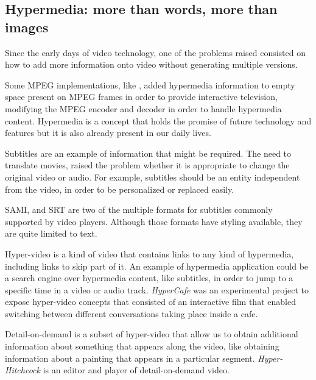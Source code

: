 \subsection{Hypermedia: more than words, more than images}
\label{hypermedia}


Since the early days of video technology, one of the problems raised consisted on how to add more information onto video without generating multiple versions.

Some \ac{MPEG} implementations, like \cite{embedded}, added hypermedia information to empty space present on \ac{MPEG} frames in order to provide interactive television, modifying the \ac{MPEG} encoder and decoder in order to handle hypermedia content.
Hypermedia is a concept that holds the promise of future technology and features but it is also already present in our daily lives.

  Subtitles are an example of information that might be required.
  The need to translate movies, raised the problem whether it is appropriate to change the original video or audio. For example, subtitles should be an entity independent from the video, in order to be personalized or replaced easily.

  \ac{SAMI}, and \ac{SRT} are two of the multiple formats for subtitles commonly supported by video players. Although those formats have styling available, they are quite limited to text. 

  Hyper-video is a kind of video that contains links to any kind of hypermedia, including links to skip part of it. An example of hypermedia application could be a search engine over hypermedia content, like subtitles, in order to jump to a specific time in a video or audio track. \emph{HyperCafe} \cite{hypercafe} was an experimental project to expose hyper-video concepts that consisted of an interactive film that enabled switching between different conversations taking place inside a cafe.
 
  Detail-on-demand is a subset of hyper-video that allow us to obtain additional information about something that appears along the video, like obtaining information about a painting that appears in a particular segment. \emph{Hyper-Hitchcock}\cite{hitchcock} is an editor and player of detail-on-demand video.


